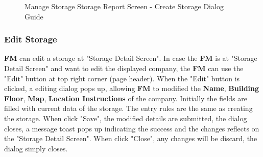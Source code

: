 \begin{figure}[H]
    \vspace{10pt}
    
    \caption{Manage Storage Storage Report Screen - Create Storage Dialog Guide}
	\label{fig:MSreportCreateGuide}
\end{figure}


\subsubsection{Edit Storage}

\textbf{FM} can edit a storage at "Storage Detail Screen".
In case the \textbf{FM} is at "Storage Detail Screen" and want to edit the displayed company, the \textbf{FM} can use the "Edit" button at top right corner (page header). 
When the "Edit" button is clicked, a editing dialog pops up, allowing \textbf{FM} to modified the \textbf{Name}, \textbf{Building Floor}, \textbf{Map}, \textbf{Location Instructions} of the company. Initially the fields are filled with current data of the storage. The entry rules are the same as creating the storage.
When click "Save", the modified details are submitted, the dialog closes, a message toast pops up indicating the success and the changes reflects on the "Storage Detail Screen". When click "Close", any changes will be discard, the dialog simply closes.

